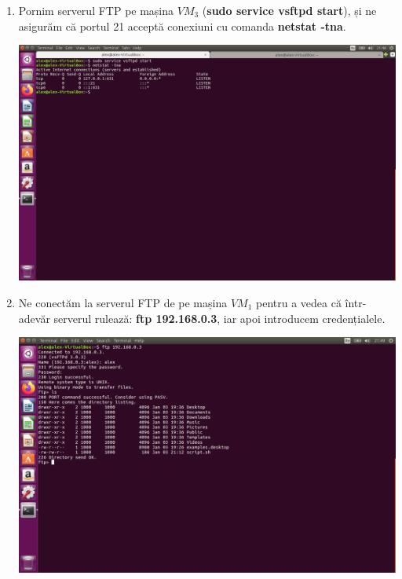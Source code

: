 \documentclass[a4paper]{article}
\begin{document}
\begin{enumerate}
    \item Pornim serverul FTP pe mașina $ VM_3 $ (\textbf{sudo service vsftpd start}), și ne asigurăm că portul 21 acceptă conexiuni cu comanda \textbf{netstat -tna}.
    
    \begin{center}
        \hspace*{-1.8cm}                                           \includegraphics[scale=0.64]{"./img/pas1.png"}       
    \end{center}
    
    \item Ne conectăm la serverul FTP de pe mașina $ VM_1 $ pentru a vedea că într-adevăr serverul rulează: \textbf{ftp 192.168.0.3}, iar apoi introducem credențialele.
    
    \begin{center}
        \hspace*{-1.8cm}                                           \includegraphics[scale=0.64]{"./img/pas2.png"}       
    \end{center}
    

\end{enumerate}
\end{document}
